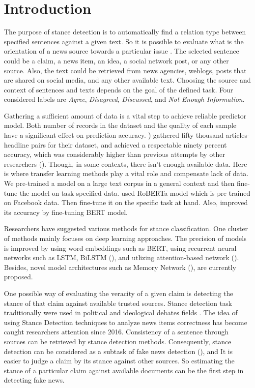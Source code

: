 

\section{Introduction}

The purpose of stance detection is to automatically find a relation type between specified sentences against a given text. So it is possible to evaluate what is the orientation of a news source towards a particular issue \cite{UCLMR}. The selected sentence could be a claim, a news item, an idea, a social network post, or any other source. Also, the text could be retrieved from news agencies, weblogs, posts that are shared on social media, and any other available text. Choosing the source and context of sentences and texts depends on the goal of the defined task. Four considered labels are \textit{Agree}, \textit{Disagreed}, \textit{Discussed}, and \textit{Not Enough Information}. 

Gathering a sufficient amount of data is a vital step to achieve reliable predictor model. Both number of records in the dataset and the quality of each sample have a significant effect on prediction accuracy. \cite{takestancefake}) gathered fifty thousand articles-headline pairs for their dataset, and achieved a respectable ninety percent accuracy, which was considerably higher than previous attempts by other researchers (\cite{book_fake}). Though, in some contexts, there isn't enough available data. Here is where transfer learning methods play a vital role and compensate lack of data. We pre-trained a model on a large text corpus in a general context and then fine-tune the model on task-specified data. \cite{takestancefake} used RoBERTa model which is pre-trained on Facebook data. Then fine-tune it on the specific task at hand.
Also, \cite{stance_robust} improved its accuracy by fine-tuning BERT model.

Researchers have suggested various methods for stance classification. One cluster of methods mainly focuses on deep learning approaches. The precision of models is improved by using word embeddings such as BERT, using recurrent neural networks such as LSTM, BiLSTM (\cite{stanceCI}), and utlizing attention-based network (\cite{stanceCI}). Besides, novel model architectures such as Memory Network (\cite{memory_network}), are currently proposed.

One possible way of evaluating the veracity of a given claim is detecting the stance of that claim against available trusted sources. Stance detection task traditionally were used in political and ideological debates fields \citep{stance_robust}. The idea of using Stance Detection techniques to analyze news items correctness has become caught researchers attention since 2016. Consistency of a sentence through sources can be retrieved by stance detection methods. Consequently, stance detection can be considered as a subtask of fake news detection (\cite{book_datafake}), and It is easier to judge a claim by its stance against other sources. So estimating the stance of a particular claim against available documents can be the first step in detecting fake news. 

